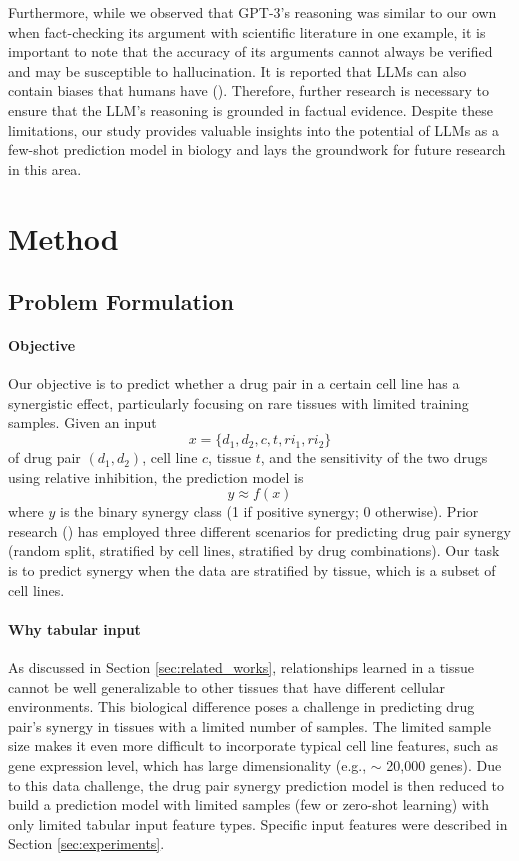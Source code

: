 {Furthermore, while we observed that GPT-3's reasoning was similar to our own when fact-checking its argument with scientific literature in one example, it is important to note that the accuracy of its arguments cannot always be verified and may be susceptible to hallucination. It is reported that LLMs can also contain biases that humans have (\cite{Schramowski2022-yg}). Therefore, further research is necessary to ensure that the LLM's reasoning is grounded in factual evidence. Despite these limitations, our study provides valuable insights into the potential of LLMs as a few-shot prediction model in biology and lays the groundwork for future research in this area.


\section{Method}

\subsection{Problem Formulation}

\paragraph{Objective}
Our objective is to predict whether a drug pair in a certain cell line has a synergistic effect, particularly focusing on rare tissues with limited training samples. Given an input $$x = \{d_1, d_2, c, t, ri_1, ri_2 \}$$ of drug pair $(d_1, d_2)$, cell line $c$, tissue $t$, and the sensitivity of the two drugs using relative inhibition, the prediction model is $$y \approx f(x) $$ where $y$ is the binary synergy class (1 if positive synergy; 0 otherwise).  Prior research (\cite{10.1093/bioinformatics/btac579, hosseini_ccsynergy_2023}) has employed three different scenarios for predicting drug pair synergy (random split, stratified by cell lines, stratified by drug combinations). Our task is to predict synergy when the data are stratified by tissue, which is a subset of cell lines.


\paragraph{Why tabular input}
As discussed in Section \ref{sec:related_works}, relationships learned in a tissue cannot be well generalizable to other tissues that have different cellular environments. This biological difference poses a challenge in predicting drug pair’s synergy in tissues with a limited number of samples. The limited sample size makes it even more difficult to incorporate typical cell line features, such as gene expression level, which has large dimensionality (e.g., $\sim$ 20,000 genes). Due to this data challenge, the drug pair synergy prediction model is then reduced to build a prediction model with limited samples (few or zero-shot learning) with only limited tabular input feature types. Specific input features were described in Section \ref{sec:experiments}.



}
